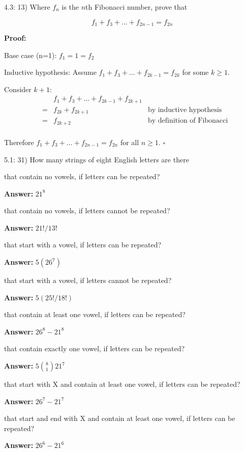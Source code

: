 \documentclass{article}
\newenvironment{proof}
{\color{PineGreen}\begin{list}{}%
         {\setlength{\leftmargin}{1cm}}%
         \item[]%
        \textbf{Proof:}
        
        }
{ $\square$\end{list}}
\newenvironment{answer}
{\color{PineGreen}\begin{list}{}%
         {\setlength{\leftmargin}{1cm}}%
         \item[]%
        \textbf{Answer: }}
{\end{list}}
\begin{document}
4.3: 13) Where $f_n$ is the $n$th Fibonacci number, prove that

\[
f_1 + f_3 + ... + f_{2n-1} = f_{2n}
\]

\begin{proof}
Base case (n=1):
$f_1 = 1 = f_2$

Inductive hypothesis:
Assume $f_1 + f_3 + ... + f_{2k-1} = f_{2k}$ for some $k \geq 1$.

Consider $k+1$:
\[\begin{array}{rclr}
&& f_1 + f_3 + ... + f_{2k-1} + f_{2k+1}& \\
&=& f_{2k} + f_{2k+1} & \textrm{by inductive hypothesis} \\
&=& f_{2k+2} & \textrm{by definition of Fibonacci} \\
\end{array}\]

Therefore $f_1 + f_3 + ... + f_{2n-1} = f_{2n}$ for all $n \geq 1$.\end{proof}

5.1: 31) How many strings of eight English letters are there

\begin{enumerate}[label=\alph{enumi})]
\item that contain no vowels, if letters can be repeated?
\begin{answer}$ 21^8 $\end{answer}
\item that contain no vowels, if letters cannot be repeated?
\begin{answer}$ 21!/13! $\end{answer}
\item that start with a vowel, if letters can be repeated?
\begin{answer}$ 5(26^7) $\end{answer}
\item that start with a vowel, if letters cannot be repeated?
\begin{answer}$ 5(25!/18!) $\end{answer}
\item that contain at least one vowel, if letters can be repeated?
\begin{answer}$ 26^8 - 21^8 $\end{answer}
\item that contain exactly one vowel, if letters can be repeated?
\begin{answer}$ 5 {8 \choose 1} 21^7 $\end{answer}
\item that start with X and contain at least one vowel, if letters can be repeated?
\begin{answer}$ 26^7 - 21^7$\end{answer}
\item that start and end with X and contain at least one vowel, if
  letters can be repeated?
\begin{answer}$ 26^6 - 21^6$\end{answer}
\end{enumerate}
\end{document}
